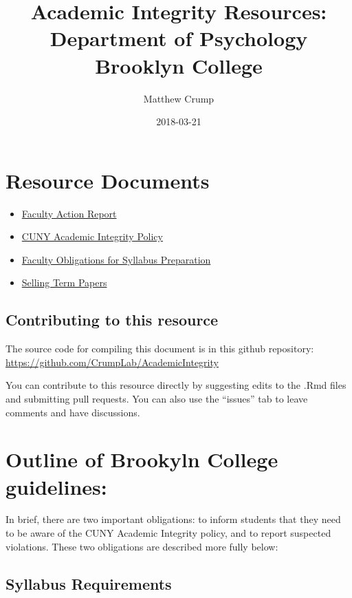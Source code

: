 \documentclass[]{book}
\title{Academic Integrity Resources: Department of Psychology Brooklyn College}
\author{Matthew Crump}
\date{2018-03-21}
\providecommand{\tightlist}{%
  \setlength{\itemsep}{0pt}\setlength{\parskip}{0pt}}
\theoremstyle{definition}
\theoremstyle{definition}
\theoremstyle{definition}
\theoremstyle{remark}
\begin{document}
\maketitle

{
\setcounter{tocdepth}{1}
\tableofcontents
}
\chapter*{Resource Documents}\label{resource-documents}

\begin{itemize}
\tightlist
\item
  \href{Resources/Faculty\%20Action\%20Report.pdf}{Faculty Action
  Report}
\item
  \href{Resources/Academic_Integrity_Policy.pdf}{CUNY Academic Integrity
  Policy}
\item
  \href{Resources/F16_FacultyObligations_andSyllabus.pdf}{Faculty
  Obligations for Syllabus Preparation}
\item
  \href{Resources/110901_TermPapers_Sale.pdf}{Selling Term Papers}
\end{itemize}

\section{Contributing to this
resource}\label{contributing-to-this-resource}

The source code for compiling this document is in this github
repository: \url{https://github.com/CrumpLab/AcademicIntegrity}

You can contribute to this resource directly by suggesting edits to the
.Rmd files and submitting pull requests. You can also use the ``issues''
tab to leave comments and have discussions.

\chapter{Outline of Brookyln College
guidelines:}\label{outline-of-brookyln-college-guidelines}

In brief, there are two important obligations: to inform students that
they need to be aware of the CUNY Academic Integrity policy, and to
report suspected violations. These two obligations are described more
fully below:

\section{Syllabus Requirements}\label{syllabus-requirements}
\end{document}
